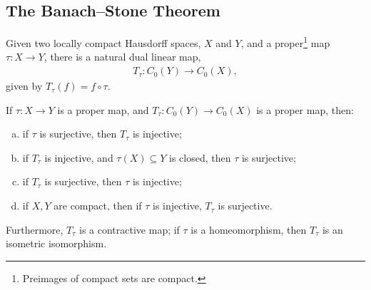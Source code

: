 \documentclass[10pt]{mypackage}
\begin{document}
\subsection{The Banach--Stone Theorem}%
Given two locally compact Hausdorff spaces, $X$ and $Y$, and a proper\footnote{Preimages of compact sets are compact.} map $\tau\colon X\rightarrow Y$, there is a natural dual linear map,
\begin{align*}
  T_{\tau}\colon C_0\left( Y \right)\rightarrow  C_0\left( X \right),
\end{align*}
given by $T_{\tau}\left( f \right) = f\circ\tau$.
\begin{theorem}
  If $\tau\colon X\rightarrow Y$ is a proper map, and $T_{\tau}\colon C_0\left( Y \right)\rightarrow C_0\left( X \right)$ is a proper map, then:
  \begin{enumerate}[(a)]
    \item if $\tau$ is surjective, then $T_{\tau}$ is injective;
    \item if $T_{\tau}$ is injective, and $\tau\left( X \right)\subseteq Y$ is closed, then $\tau$ is surjective;
    \item if $T_{\tau}$ is surjective, then $\tau$ is injective;
    \item if $X,Y$ are compact, then if $\tau$ is injective, $T_{\tau}$ is surjective.
  \end{enumerate}
  Furthermore, $T_{\tau}$ is a contractive map; if $\tau$ is a homeomorphism, then $T_{\tau}$ is an isometric isomorphism.
\end{theorem}
\end{document}
